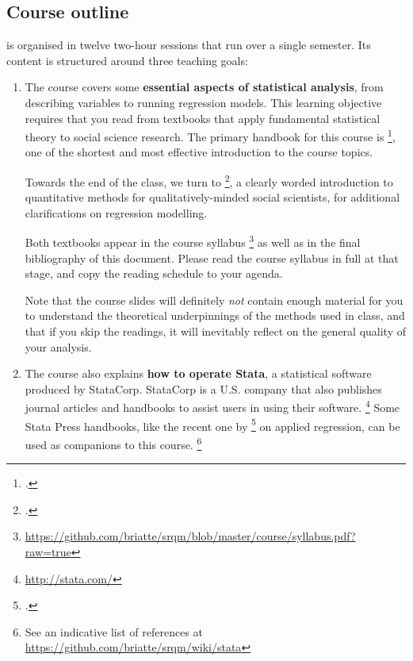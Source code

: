 \subsection{Course outline}%

 is organised in twelve two-hour sessions that run over a single semester. Its content is structured around three teaching goals:%

\begin{enumerate}
  

	\label{textbooks}%
  \item The course covers some \textbf{essential aspects of statistical analysis}, from describing variables to running regression models. %
  	This learning objective requires that you read from textbooks that apply fundamental statistical theory to social science research. The primary handbook for this course is \footcite{Urdan:2010a}, one of the shortest and most effective introduction to the course topics. %
	
		Towards the end of the class, we turn to \footcite{FeinsteinThomas:2002d}, a clearly worded introduction to quantitative methods for qualitatively-minded social scientists, for additional clarifications on regression modelling.%
  
  	Both textbooks appear in the course syllabus%
		\footnote{\url{https://github.com/briatte/srqm/blob/master/course/syllabus.pdf?raw=true}} as well as in the final bibliography of this document. Please read the course syllabus in full at that stage, and copy the reading schedule to your agenda.%
		
		Note that the course slides will definitely \emph{not} contain enough material for you to understand the theoretical underpinnings of the methods used in class, and that if you skip the readings, it will inevitably reflect on the general quality of your analysis.%


  \item The course also explains \textbf{how to operate Stata}, a statistical software produced by StataCorp. %
	  StataCorp is a U.S. company that also publishes journal articles and handbooks to assist users in using their software.%
		\footnote{\url{http://stata.com/}} %
		Some Stata Press handbooks, like the recent one by \footcite{Mitchell:2012a} on applied regression, can be used as companions to this course.%
		\footnote{See an indicative list of references at %
			\url{https://github.com/briatte/srqm/wiki/stata}} %
		

\end{enumerate}
